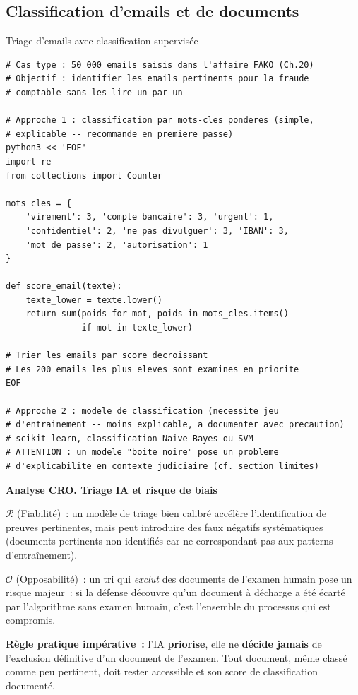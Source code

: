 \subsection{Classification d'emails et de documents}

\begin{boxoutils}{Triage d'emails avec classification supervisée}
\begin{lstlisting}[language=bash_forensique]
# Cas type : 50 000 emails saisis dans l'affaire FAKO (Ch.20)
# Objectif : identifier les emails pertinents pour la fraude
# comptable sans les lire un par un

# Approche 1 : classification par mots-cles ponderes (simple,
# explicable -- recommande en premiere passe)
python3 << 'EOF'
import re
from collections import Counter

mots_cles = {
    'virement': 3, 'compte bancaire': 3, 'urgent': 1,
    'confidentiel': 2, 'ne pas divulguer': 3, 'IBAN': 3,
    'mot de passe': 2, 'autorisation': 1
}

def score_email(texte):
    texte_lower = texte.lower()
    return sum(poids for mot, poids in mots_cles.items()
               if mot in texte_lower)

# Trier les emails par score decroissant
# Les 200 emails les plus eleves sont examines en priorite
EOF

# Approche 2 : modele de classification (necessite jeu
# d'entrainement -- moins explicable, a documenter avec precaution)
# scikit-learn, classification Naive Bayes ou SVM
# ATTENTION : un modele "boite noire" pose un probleme
# d'explicabilite en contexte judiciaire (cf. section limites)
\end{lstlisting}
\end{boxoutils}

\begin{boxCRO}
\textbf{Analyse CRO. Triage IA et risque de biais}

$\mathcal{R}$ (Fiabilité)~: un modèle de triage bien calibré accélère
l'identification de preuves pertinentes, mais peut introduire des
faux négatifs systématiques (documents pertinents non identifiés
car ne correspondant pas aux patterns d'entraînement).

$\mathcal{O}$ (Opposabilité)~: un tri qui \emph{exclut} des documents
de l'examen humain pose un risque majeur~: si la défense découvre
qu'un document à décharge a été écarté par l'algorithme sans examen
humain, c'est l'ensemble du processus qui est compromis.


\textbf{Règle pratique impérative~:} l'IA \textbf{priorise}, elle
ne \textbf{décide jamais} de l'exclusion définitive d'un document
de l'examen. Tout document, même classé comme peu pertinent, doit
rester accessible et son score de classification documenté.
\end{boxCRO}

